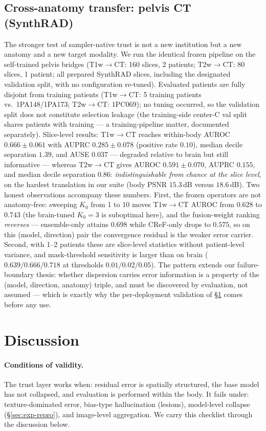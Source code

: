 \documentclass[11pt]{article}
\begin{document}
\subsection{Cross-anatomy transfer: pelvis CT (SynthRAD)}
\label{sec:exp-synthrad}
The stronger test of sampler-native trust is not a new institution but a
new anatomy and a new target modality. We run the identical frozen pipeline
on the self-trained pelvis bridges (T1w$\to$CT: 160 slices, 2 patients;
T2w$\to$CT: 80 slices, 1 patient; all prepared SynthRAD slices, including
the designated validation split, with no configuration re-tuned). Evaluated
patients are fully disjoint from training patients (T1w$\to$CT: 5 training
patients vs.\ 1PA148/1PA173; T2w$\to$CT: 1PC069); no tuning occurred, so the
validation split does not constitute selection leakage (the training-side
center-C val split shares patients with training --- a training-pipeline
matter, documented separately).
Slice-level results: T1w$\to$CT reaches within-body AUROC $0.666\pm0.061$
with AUPRC $0.285\pm0.078$ (positive rate $0.10$), median decile separation
$1.39$, and AUSE $0.037$ --- degraded relative to brain but still
informative --- whereas T2w$\to$CT gives AUROC $0.591\pm0.070$, AUPRC
$0.155$, and median decile separation $0.86$: \emph{indistinguishable from
chance at the slice level}, on the hardest translation in our suite (body
PSNR $15.3$\,dB versus $18.6$\,dB).
Two honest observations accompany these numbers. First, the frozen
operators are not anatomy-free: sweeping $K_0$ from 1 to 10 moves T1w$\to$CT
AUROC from $0.628$ to $0.743$ (the brain-tuned $K_0{=}3$ is suboptimal
here), and the fusion-weight ranking \emph{reverses} --- ensemble-only
attains $0.698$ while CReF-only drops to $0.575$, so on this (model,
direction) pair the convergence residual is the weaker error carrier.
Second, with 1--2 patients these are slice-level statistics without
patient-level variance, and mask-threshold sensitivity is larger than on
brain ($0.639/0.666/0.718$ at thresholds $0.01/0.02/0.05$). The pattern
extends our failure-boundary thesis: whether dispersion carries error
information is a property of the (model, direction, anatomy) triple, and
must be discovered by evaluation, not assumed --- which is exactly why the
per-deployment validation of \S\ref{sec:discussion} comes before any use.

\section{Discussion}
\label{sec:discussion}
\paragraph{Conditions of validity.}
The trust layer works when: residual error is spatially structured, the base
model has not collapsed, and evaluation is performed within the body. It fails
under: texture-dominated error, bias-type hallucination (lesions), model-level
collapse (\S\ref{sec:exp-repro}), and image-level aggregation. We carry this
checklist through the discussion below.
\end{document}
